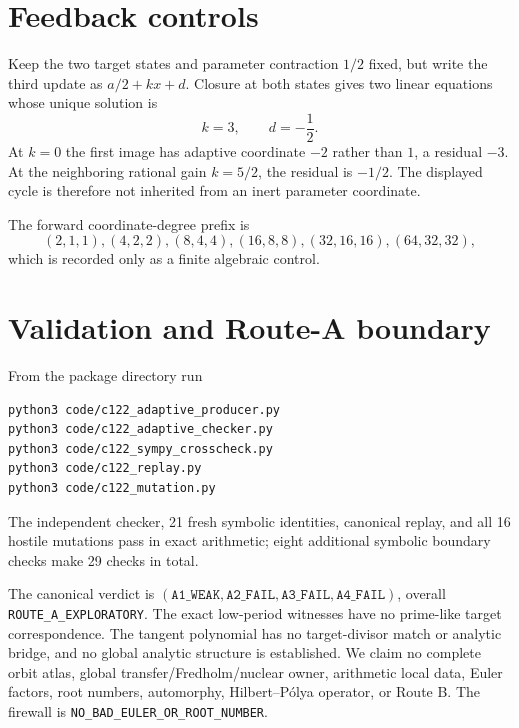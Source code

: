\documentclass[10pt]{article}
\begin{document}
\section{Feedback controls}
Keep the two target states and parameter contraction $1/2$ fixed, but write
the third update as $a/2+kx+d$.  Closure at both states gives two linear
equations whose unique solution is
\[
 k=3,\qquad d=-\frac12.
\]
At $k=0$ the first image has adaptive coordinate $-2$ rather than $1$, a
residual $-3$.  At the neighboring rational gain $k=5/2$, the residual is
$-1/2$.  The displayed cycle is therefore not inherited from an inert
parameter coordinate.

The forward coordinate-degree prefix is
\[
 (2,1,1),(4,2,2),(8,4,4),(16,8,8),(32,16,16),(64,32,32),
\]
which is recorded only as a finite algebraic control.

\section{Validation and Route-A boundary}
From the package directory run
\begin{verbatim}
python3 code/c122_adaptive_producer.py
python3 code/c122_adaptive_checker.py
python3 code/c122_sympy_crosscheck.py
python3 code/c122_replay.py
python3 code/c122_mutation.py
\end{verbatim}
The independent checker, 21 fresh symbolic identities, canonical replay, and
all 16 hostile mutations pass in exact arithmetic; eight additional symbolic
boundary checks make 29 checks in total.

The canonical verdict is
$(\texttt{A1\_WEAK},\texttt{A2\_FAIL},\texttt{A3\_FAIL},
\texttt{A4\_FAIL})$, overall \texttt{ROUTE\_A\_EXPLORATORY}.
The exact low-period witnesses have no prime-like target correspondence.
The tangent polynomial has no target-divisor match or analytic bridge, and no
global analytic structure is established.  We claim no complete orbit atlas,
global transfer/Fredholm/nuclear owner, arithmetic local data, Euler factors,
root numbers, automorphy, Hilbert--P\'olya operator, or Route B.  The firewall is
\texttt{NO\_BAD\_EULER\_OR\_ROOT\_NUMBER}.
\end{document}
